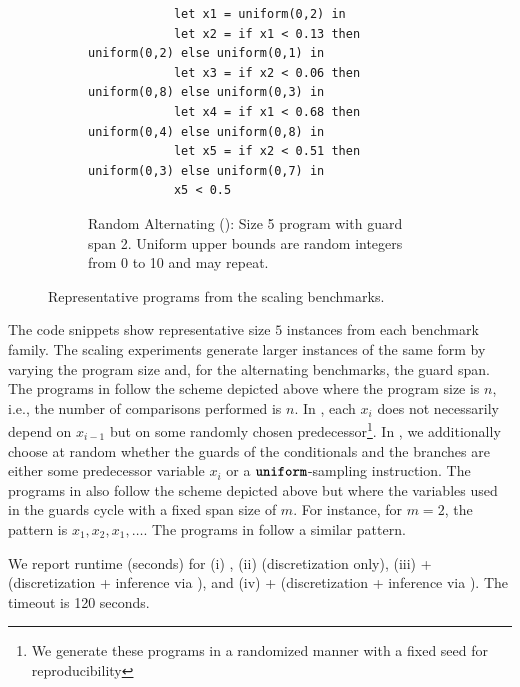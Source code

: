 \begin{figure}
\begin{subfigure}{\textwidth}
        \begin{lstlisting}
            let x1 = uniform(0,2) in
            let x2 = if x1 < 0.13 then uniform(0,2) else uniform(0,1) in
            let x3 = if x2 < 0.06 then uniform(0,8) else uniform(0,3) in
            let x4 = if x1 < 0.68 then uniform(0,4) else uniform(0,8) in
            let x5 = if x2 < 0.51 then uniform(0,3) else uniform(0,7) in
            x5 < 0.5
        \end{lstlisting}
        \caption{Random Alternating (): Size 5 program with guard span 2. Uniform upper bounds are random integers from 0 to 10 and may repeat.}
        \label{fig:alt-benchmarks-d-example}
    \end{subfigure}
    \caption{Representative programs from the scaling benchmarks.}
    \label{fig:alt-benchmark-examples}
\end{figure}


The code snippets show representative size $5$ instances from each benchmark family. The scaling experiments generate larger instances of the same form by varying the program size and, for the alternating benchmarks, the guard span. The programs in  follow the scheme depicted above where the program size is $n$, i.e., the number of comparisons performed is $n$. In , each $x_i$ does not necessarily depend on $x_{i-1}$ but on some randomly chosen predecessor\footnote{We generate these programs in a randomized manner with a fixed seed for reproducibility}. In , we additionally choose at random whether the guards of the conditionals and the branches are either some predecessor variable $x_i$ or a  $\textnormal{\ttfamily\bfseries uniform}$-sampling instruction.  The programs in  also follow the scheme depicted above but where the variables used in the guards cycle with a fixed span size of $m$. For instance, for $m=2$, the pattern is $x_1,x_2,x_1,\ldots$. The programs in  follow a similar pattern.
%

%



We report runtime (seconds) for (i) \SPPL{}, (ii) \Slice{} (discretization only), (iii) \Slice{}+\Dice{} (discretization + inference via \Dice{}), and (iv) \Slice{}+\Roulette{} (discretization + inference via \Roulette{}). The timeout is 120 seconds.

